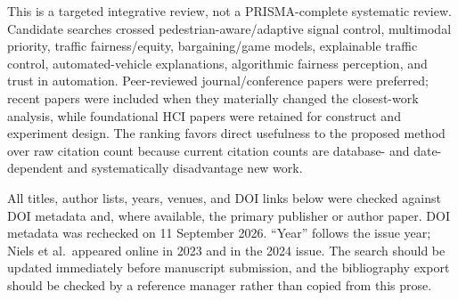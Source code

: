 \documentclass[
  english,
  11pt,
  a4paper,
]{article}
\begin{document}
This is a targeted integrative review, not a PRISMA-complete systematic
review. Candidate searches crossed pedestrian-aware/adaptive signal
control, multimodal priority, traffic fairness/equity, bargaining/game
models, explainable traffic control, automated-vehicle explanations,
algorithmic fairness perception, and trust in automation. Peer-reviewed
journal/conference papers were preferred; recent papers were included
when they materially changed the closest-work analysis, while
foundational HCI papers were retained for construct and experiment
design. The ranking favors direct usefulness to the proposed method over
raw citation count because current citation counts are database- and
date-dependent and systematically disadvantage new work.

All titles, author lists, years, venues, and DOI links below were
checked against DOI metadata and, where available, the primary publisher
or author paper. DOI metadata was rechecked on 11 September 2026.
``Year'' follows the issue year; Niels et al.~appeared online in 2023
and in the 2024 issue. The search should be updated immediately before
manuscript submission, and the bibliography export should be checked by
a reference manager rather than copied from this prose.
\end{document}
